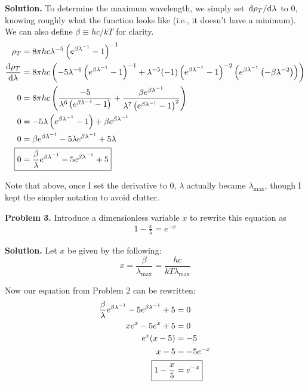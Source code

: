 \documentclass{article}
\begin{document}
\textbf{Solution.} To determine the maximum wavelength, we simply set $\dv*{\rho_T}{\lambda}$ to 0, knowing roughly what the function looks like (i.e., it doesn't have a minimum). We can also define $\beta \equiv hc/kT$ for clarity.
\begin{equation*}
\begin{aligned}
\rho_T &= 8\pi hc\lambda^{-5}\left(e^{\beta\lambda^{-1}}-1\right)^{-1} \\
\frac{\dd\rho_T}{\dd \lambda} &= 8\pi hc\left(-5\lambda^{-6}\left(e^{\beta\lambda^{-1}}-1\right)^{-1} + \lambda^{-5}(-1)\left(e^{\beta\lambda^{-1}}-1\right)^{-2}\left(e^{\beta\lambda^{-1}}\left(-\beta\lambda^{-2}\right)\right)\right) \\
0 &= 8\pi hc\left(\frac{-5}{\lambda^6\left(e^{\beta\lambda^{-1}}-1\right)} + \frac{\beta e^{\beta\lambda^{-1}}}{\lambda^7\left(e^{\beta\lambda^{-1}}-1\right)^2}\right) \\
0 &= -5\lambda\left(e^{\beta\lambda^{-1}}-1\right) + \beta e^{\beta\lambda^{-1}} \\
0 &= \beta e^{\beta\lambda^{-1}} - 5\lambda e^{\beta\lambda^{-1}} + 5\lambda \\
\Aboxed{0 &= \frac{\beta}{\lambda} e^{\beta\lambda^{-1}} - 5e^{\beta\lambda^{-1}} + 5}
\end{aligned}
\end{equation*}

Note that above, once I set the derivative to 0, $\lambda$ actually became $\lambda_\text{max}$, though I kept the simpler notation to avoid clutter.

\textbf{Problem 3.} Introduce a dimensionless variable $x$ to rewrite this equation as
\begin{equation*}
\begin{aligned}
1 - \frac{x}{5} = e^{-x}
\end{aligned}
\end{equation*}

\textbf{Solution.} Let $x$ be given by the following:
\begin{equation}
x = \frac{\beta}{\lambda_\text{max}} = \frac{hc}{kT\lambda_\text{max}}
\end{equation}

Now our equation from Problem 2 can be rewritten:
\begin{equation*}
\begin{aligned}
\frac{\beta}{\lambda} e^{\beta\lambda^{-1}} - 5e^{\beta\lambda^{-1}} + 5 &= 0\\
xe^x - 5e^x + 5 &= 0\\
e^x (x - 5) &= -5 \\
x - 5 &= -5e^{-x} \\
\Aboxed{1 - \frac{x}{5} &= e^{-x}}
\end{aligned}
\end{equation*}
\end{document}
